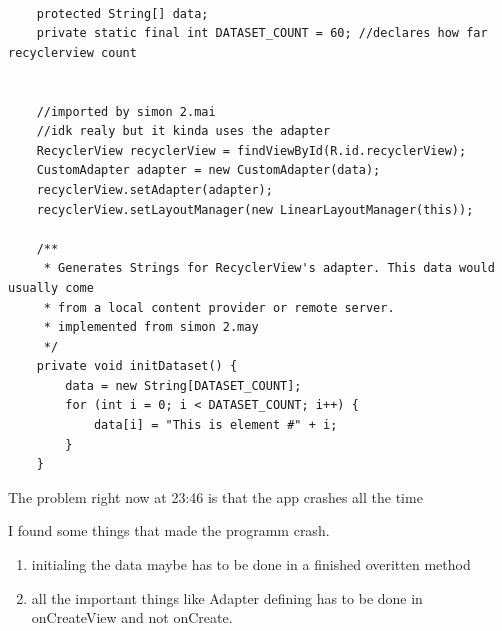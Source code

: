 \begin{lstlisting}

    protected String[] data;
    private static final int DATASET_COUNT = 60; //declares how far recyclerview count


    //imported by simon 2.mai
    //idk realy but it kinda uses the adapter
    RecyclerView recyclerView = findViewById(R.id.recyclerView);
    CustomAdapter adapter = new CustomAdapter(data);
    recyclerView.setAdapter(adapter);
    recyclerView.setLayoutManager(new LinearLayoutManager(this));

    /**
     * Generates Strings for RecyclerView's adapter. This data would usually come
     * from a local content provider or remote server.
     * implemented from simon 2.may
     */
    private void initDataset() {
        data = new String[DATASET_COUNT];
        for (int i = 0; i < DATASET_COUNT; i++) {
            data[i] = "This is element #" + i;
        }
    }
\end{lstlisting}

The problem right now at 23:46 is that the app crashes all the time

I found some things that made the programm crash. \\

\begin{enumerate}

\item initialing the data maybe has to be done in a finished overitten method 

\item all the important things like Adapter defining has to be done in onCreateView and not onCreate.

\end{enumerate}




























